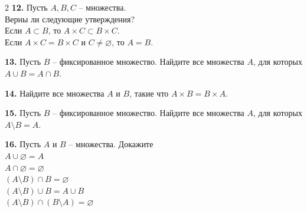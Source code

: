 \begin{multicols}{2}
\bigskip\noindent\textbf{12.}
Пусть $A,B,C$ -- множества.\\
Верны ли следующие утверждения?\\
Если $A\subset B$, то $A\times C\subset B\times C$.\\
Если $A\times C=B\times C$ и $C\neq\varnothing$, то $A=B$.

\bigskip\noindent\textbf{13.}
Пусть $B$ -- фиксированное множество. Найдите все множества $A$, для которых\\
$A\cup B=A\cap B$.

\bigskip\noindent\textbf{14.}
Найдите все множества $A$ и $B$, такие что
$A\times B=B\times A$.

\bigskip\noindent\textbf{15.}
Пусть $B$ -- фиксированное множество. Найдите все множества $A$, для которых\\
$A\setminus B=A$.

\bigskip\noindent\textbf{16.}
Пусть $A$ и $B$ -- множества. Докажите\\
$A\cup \varnothing=A$\\
$A\cap \varnothing=\varnothing$\\
$(A \setminus B)\cap B=\varnothing$\\
$(A \setminus B)\cup B=A\cup B$\\
$(A \setminus B)\cap(B \setminus A)=\varnothing$
\end{multicols}
